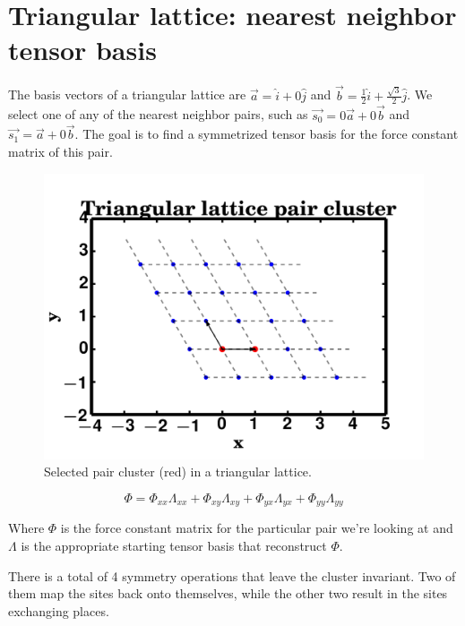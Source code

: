 \documentclass[12pt, fleqn]{article}
\begin{document}
\section{Triangular lattice: nearest neighbor tensor basis}
The basis vectors of a triangular lattice are $\vec{a}=\hat{i}+0\hat{j}$
and $\vec{b}=\frac{1}{2}\hat{i}+\frac{\sqrt{3}}{2}\hat{j}$. We select one
of any of the nearest neighbor pairs, such as $\vec{s_0}=0\vec{a}+0\vec{b}$
and $\vec{s_1}=\vec{a}+0\vec{b}$. The goal is to find a symmetrized tensor basis
for the force constant matrix of this pair.

\begin{figure}[h]
    \begin{center}
        \includegraphics[max width=\textwidth]{./triangularclust.png}
    \end{center}
    \caption{Selected pair cluster (red) in a triangular lattice.}
    \label{fig:triangular}
\end{figure}

\begin{equation}
    \label{tensorbasis}
    \Phi=\Phi_{xx}\Lambda_{xx}+\Phi_{xy}\Lambda_{xy}+\Phi_{yx}\Lambda_{yx}+\Phi_{yy}\Lambda_{yy}
\end{equation}

Where $\Phi$ is the force constant matrix for the particular pair we're looking at
and $\Lambda$ is the appropriate starting tensor basis that reconstruct $\Phi$.

There is a total of 4 symmetry operations that leave the cluster invariant. Two of them
map the sites back onto themselves, while the other two result in the sites exchanging places.
\end{document}
